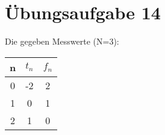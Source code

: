 

    \section*{Übungsaufgabe 14}
    Die gegeben Messwerte (N=3):\\
    \begin{tabular}{|c| c| c|}
    	\hline
		\textbf{n}	&	\textbf{$t_n$}	&	\textbf{$f_n$}\\
		\hline
		0	&	-2	&	2\\
		1	&	0	&	1\\
		2	&	1	&	0
    \end{tabular}\\

